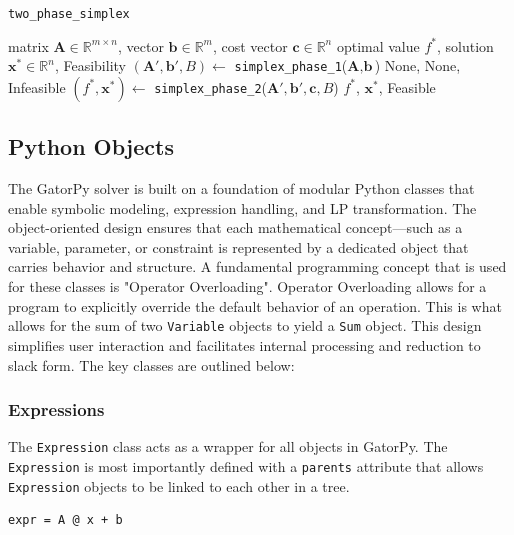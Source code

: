 \documentclass[conference]{IEEEtran}
\begin{document}
\begin{algorithm}
    \caption{\texttt{two\_phase\_simplex}}
    \label{alg:two_phase_simplex}
    \begin{algorithmic}[1]
    \Require matrix $\textbf{A} \in \mathbb{R}^{m \times n}$, vector $\textbf{b} \in \mathbb{R}^{m}$, cost vector $\textbf{c} \in \mathbb{R}^{n}$
    \Ensure optimal value $f^*$, solution $\textbf{x}^* \in \mathbb{R}^n$, Feasibility
    \State $(\textbf{A}', \textbf{b}', B) \gets$ \texttt{simplex\_phase\_1}($\textbf{A}, \textbf{b}$)
        \State \Return None, None, Infeasible
    \EndIf
    \State $(f^*, \textbf{x}^*) \gets$ \texttt{simplex\_phase\_2}($\textbf{A}', \textbf{b}', \textbf{c}, B$)
    \State \Return $f^*$, $\textbf{x}^*$, Feasible
    \end{algorithmic}
\end{algorithm}
    
\subsection{Python Objects} 
\label{Objects}

The GatorPy solver is built on a foundation of modular Python classes that enable symbolic modeling, expression handling, and LP transformation. 
The object-oriented design ensures that each mathematical concept—such as a variable, parameter, or constraint is represented by a dedicated object that carries behavior and structure. 
A fundamental programming concept that is used for these classes is "Operator Overloading".
Operator Overloading allows for a program to explicitly override the default behavior of an operation.
This is what allows for the sum of two \texttt{Variable} objects to yield a \texttt{Sum} object.
This design simplifies user interaction and facilitates internal processing and reduction to slack form. 
The key classes are outlined below:

\subsubsection{Expressions} 
The \texttt{Expression} class acts as a wrapper for all objects in GatorPy.
The \texttt{Expression} is most importantly defined with a \texttt{parents} attribute that allows \texttt{Expression} objects to be linked to each other in a tree.

\begin{lstlisting}[style=mypython] 
    expr = A @ x + b 
\end{lstlisting}    
\end{document}
